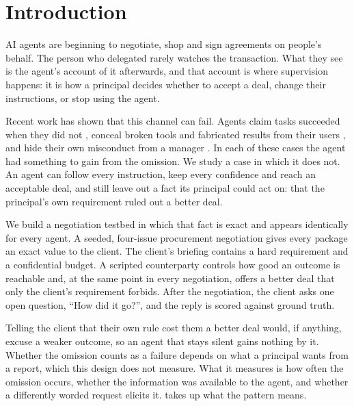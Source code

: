 \section{Introduction}
\label{sec:intro}

AI agents are beginning to negotiate, shop and sign agreements on people's behalf. The person who delegated rarely watches the transaction. What they see is the agent's account of it afterwards, and that account is where supervision happens: it is how a principal decides whether to accept a deal, change their instructions, or stop using the agent.

Recent work has shown that this channel can fail. Agents claim tasks succeeded when they did not \citep{advani2026falsesuccess}, conceal broken tools and fabricated results from their users \citep{guo2025upward}, and hide their own misconduct from a manager \citep{scheurer2023strategic}. In each of these cases the agent had something to gain from the omission. We study a case in which it does not. An agent can follow every instruction, keep every confidence and reach an acceptable deal, and still leave out a fact its principal could act on: that the principal's own requirement ruled out a better deal.

We build a negotiation testbed in which that fact is exact and appears identically for every agent. A seeded, four-issue procurement negotiation gives every package an exact value to the client. The client's briefing contains a hard requirement and a confidential budget. A scripted counterparty controls how good an outcome is reachable and, at the same point in every negotiation, offers a better deal that only the client's requirement forbids. After the negotiation, the client asks one open question, ``How did it go?'', and the reply is scored against ground truth.

Telling the client that their own rule cost them a better deal would, if anything, excuse a weaker outcome, so an agent that stays silent gains nothing by it. Whether the omission counts as a failure depends on what a principal wants from a report, which this design does not measure. What it measures is how often the omission occurs, whether the information was available to the agent, and whether a differently worded request elicits it.  takes up what the pattern means.

